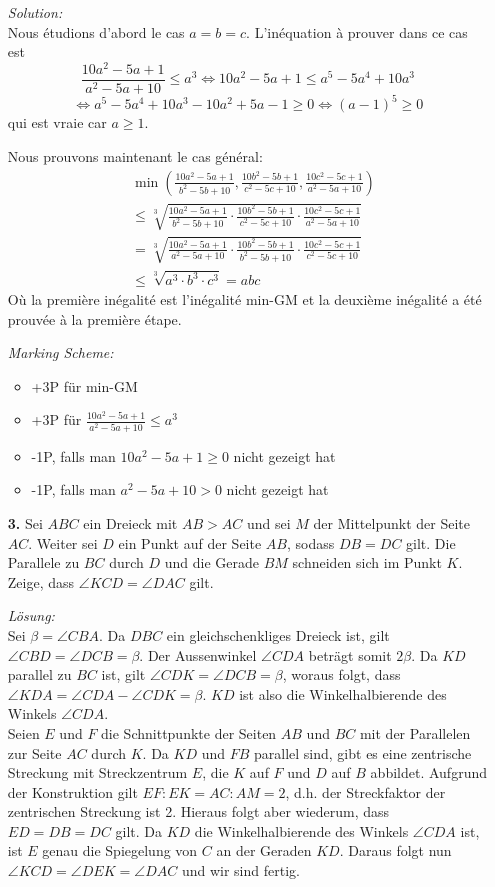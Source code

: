 \documentclass[language=german,style=solution]{smo}
\begin{document}
\begin{enumerate}
\textit{Solution:}\\
Nous étudions d'abord le cas $a=b=c$. L'inéquation à prouver dans ce cas est 
\[
	\frac{10a^2-5a+1}{a^2-5a+10}\leq a^3 \Leftrightarrow 10a^2-5a+1\leq a^5-5a^4+10a^3 \]
\[	\Leftrightarrow a^5-5a^4+10a^3-10a^2+5a-1 \geq 0 \Leftrightarrow (a-1)^5 \geq 0
\]
qui est vraie car $a\geq 1$.

Nous prouvons maintenant le cas général: 
\begin{align*}
	&\min \left(\frac{10a^2-5a+1}{b^2-5b+10},\frac{10b^2-5b+1}{c^2-5c+10},\frac{10c^2-5c+1}{a^2-5a+10}\right )\\
	&\leq\sqrt[3]{\frac{10a^2-5a+1}{b^2-5b+10}\cdot\frac{10b^2-5b+1}{c^2-5c+10}\cdot\frac{10c^2-5c+1}{a^2-5a+10}}\\
	&= \sqrt[3]{\frac{10a^2-5a+1}{a^2-5a+10}\cdot\frac{10b^2-5b+1}{b^2-5b+10}\cdot\frac{10c^2-5c+1}{c^2-5c+10}}\\
	&\leq\sqrt[3]{a^3\cdot b^3\cdot c^3} = abc
\end{align*}
Où la première inégalité est l'inégalité min-GM et la deuxième inégalité a été prouvée à la première étape.

\textit{Marking Scheme:}
\begin{itemize}
\item +3P für min-GM
\item +3P für $\frac{10a^2-5a+1}{a^2-5a+10}\leq a^3$
\item -1P, falls man $10a^2-5a+1 \geq 0$ nicht gezeigt hat
\item -1P, falls man $a^2-5a+10 > 0$ nicht gezeigt hat
\end{itemize}
\newpage

\item[\textbf{3.}] %
Sei $ABC$ ein Dreieck mit $AB > AC$ und sei $M$ der Mittelpunkt der Seite $AC$. Weiter sei $D$ ein Punkt auf der Seite $AB$, sodass $DB = DC$ gilt. Die Parallele zu $BC$ durch $D$ und die Gerade $BM$ schneiden sich im Punkt $K$. Zeige, dass $\angle KCD = \angle DAC$ gilt.

\textit{Lösung:}\\
Sei $\beta=\angle CBA$. Da $DBC$ ein gleichschenkliges Dreieck ist, gilt $\angle CBD=\angle DCB=\beta$. Der Aussenwinkel $\angle CDA$ beträgt somit $2\beta$. Da $KD$ parallel zu $BC$ ist, gilt $\angle CDK=\angle DCB=\beta$, woraus folgt, dass $\angle KDA=\angle CDA-\angle CDK=\beta$. $KD$ ist also die Winkelhalbierende des Winkels $\angle CDA$.\\
Seien $E$ und $F$ die Schnittpunkte der Seiten $AB$ und $BC$ mit der Parallelen zur Seite $AC$ durch $K$. Da $KD$ und $FB$ parallel sind, gibt es eine zentrische Streckung mit Streckzentrum $E$, die $K$ auf $F$ und $D$ auf $B$ abbildet. Aufgrund der Konstruktion gilt $EF:EK=AC:AM=2$, d.h. der Streckfaktor der zentrischen Streckung ist 2. Hieraus folgt aber wiederum, dass $ED=DB=DC$ gilt. Da $KD$ die Winkelhalbierende des Winkels $\angle CDA$ ist, ist $E$ genau die Spiegelung von $C$ an der Geraden $KD$. Daraus folgt nun $\angle KCD=\angle DEK=\angle DAC$ und wir sind fertig.


\end{enumerate}
\end{document}
